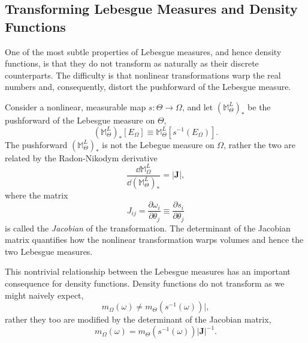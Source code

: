 \subsection{Transforming Lebesgue Measures and Density Functions}

One of the most subtle properties of Lebesgue measures, and
hence density functions, is that they do not transform as naturally
as their discrete counterparts.  The difficulty is that nonlinear
transformations warp the real numbers and, consequently,
distort the pushforward of the Lebesgue measure.  

Consider a nonlinear, measurable map $s : \Theta \rightarrow \Omega$,
and let $\left( \mathbb{M}^{L}_{\Theta} \right)_{*}$ be the pushforward 
of the Lebesgue measure on $\Theta$,
%
\begin{equation*}
\left( \mathbb{M}^{L}_{\Theta} \right)_{*} \! \left[ E_{\Omega} \right]
\equiv
\mathbb{M}^{L}_{\Theta} \! \left[ s^{-1} \! \left( E_{\Omega} \right) \right].
\end{equation*}
%
The pushforward $\left( \mathbb{M}^{L}_{\Theta} \right)_{*}$ is not the
Lebegue measure on $\Omega$, rather the two are related by the
Radon-Nikodym derivative
%
\begin{equation*}
\frac{ \dd \mathbb{M}^{L}_{\Omega} }
{\dd \left( \mathbb{M}^{L}_{\Theta} \right)_{*} }
=
\left| \mathbf{J} \right|,
\end{equation*}
%
where the matrix
%
\begin{equation*}
J_{ij} 
= 
\frac{\partial \omega_{i} }{ \partial \theta_{j} }
\equiv 
\frac{ \partial s_{i} }{ \partial \theta_{j} }
\end{equation*} 
%
is called the \emph{Jacobian} of the transformation.  The determinant
of the Jacobian matrix quantifies how the nonlinear transformation 
warps volumes and hence the two Lebesgue measures.

This nontrivial relationship between the Lebesgue measures has
an important consequence for density functions.  Density functions do 
not transform as we might naively expect,
%
\begin{equation*}
m_{\Omega} \! \left( \omega \right) 
\ne 
m_{\Theta} \! \left( s^{-1} \! \left( \omega \right) \right) |,
\end{equation*}
%
rather they too are modified by the determinant of the Jacobian matrix,
%
\begin{equation*}
m_{\Omega} \! \left( \omega \right) 
= 
m_{\Theta} \! \left( s^{-1} \! \left( \omega \right) \right) | \mathbf{J} |^{-1}.
\end{equation*}

